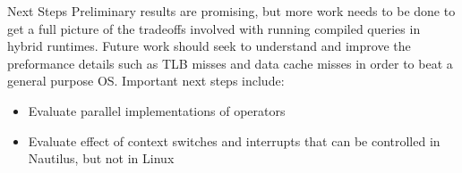 \begin{block}{Next Steps}
    Preliminary results are promising, but more work needs to be done to get a full picture of the tradeoffs involved with running compiled queries in hybrid runtimes. Future work should seek to understand and improve the preformance details such as TLB misses and data cache misses in order to beat a general purpose OS. Important next steps include:

    \begin{itemize}
    \item Evaluate parallel implementations of operators
    \item Evaluate effect of context switches and interrupts that can be controlled in Nautilus, but not in Linux
  \end{itemize}
\end{block}

